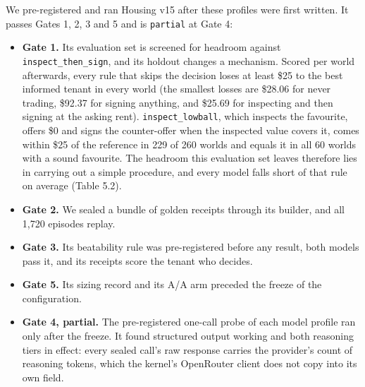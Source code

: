 We pre-registered and ran Housing v15 after these profiles were first written. It passes Gates 1, 2, 3 and 5 and is
\texttt{partial} at Gate 4:

\begin{itemize}
\tightlist
\item
  \textbf{Gate 1.} Its evaluation set is screened for headroom against \texttt{inspect\_\allowbreak{}then\_\allowbreak{}sign}, and its holdout changes a
  mechanism. Scored per world afterwards, every rule that skips the decision loses at least \$25 to the best informed
  tenant in every world (the smallest losses are \$28.06 for never trading, \$92.37 for signing anything, and \$25.69 for
  inspecting and then signing at the asking rent). \texttt{inspect\_\allowbreak{}lowball}, which inspects the favourite, offers \$0 and signs
  the counter-offer when the inspected value covers it, comes within \$25 of the reference in 229 of 260 worlds and
  equals it in all 60 worlds with a sound favourite. The headroom this evaluation set leaves therefore lies in carrying
  out a simple procedure, and every model falls short of that rule on average (Table 5.2).
\item
  \textbf{Gate 2.} We sealed a bundle of golden receipts through its builder, and all 1,720 episodes replay.
\item
  \textbf{Gate 3.} Its beatability rule was pre-registered before any result, both models pass it, and its receipts score
  the tenant who decides.
\item
  \textbf{Gate 5.} Its sizing record and its A/A arm preceded the freeze of the configuration.
\item
  \textbf{Gate 4, partial.} The pre-registered one-call probe of each model profile ran only after the freeze. It found
  structured output working and both reasoning tiers in effect: every sealed call's raw response carries the
  provider's count of reasoning tokens, which the kernel's OpenRouter client does not copy into its own field.
\end{itemize}

